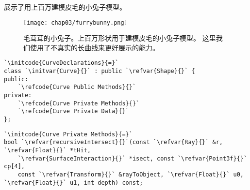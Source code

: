 展示了用上百万建模皮毛的小兔子模型。
\begin{figure}[htbp]
    \centering\texttt{[image: chap03/furrybunny.png]}
    \caption{毛茸茸的小兔子。上百万形状用于建模皮毛的小兔子模型。
        这里我们使用了不真实的长曲线来更好展示的能力。}
    \label{fig:3.17}
\end{figure}
\begin{lstlisting}
`\initcode{CurveDeclarations}{=}`
class `\initvar{Curve}{}` : public `\refvar{Shape}{}` {
public:
    `\refcode{Curve Public Methods}{}`
private:
    `\refcode{Curve Private Methods}{}`
    `\refcode{Curve Private Data}{}`
};
\end{lstlisting}
\begin{lstlisting}
`\initcode{Curve Private Methods}{=}`
bool `\refvar{recursiveIntersect}{}`(const `\refvar{Ray}{}` &r, `\refvar{Float}{}` *tHit,
    `\refvar{SurfaceInteraction}{}` *isect, const `\refvar{Point3f}{}` cp[4],
    const `\refvar{Transform}{}` &rayToObject, `\refvar{Float}{}` u0, `\refvar{Float}{}` u1, int depth) const;

\end{lstlisting}